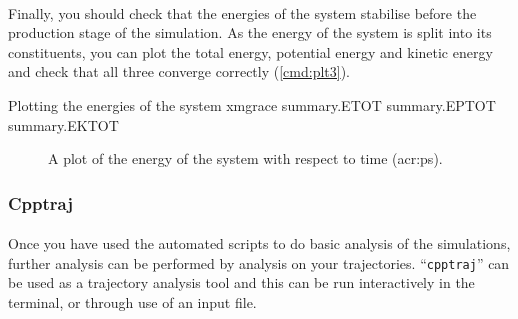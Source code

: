     \paragraph{}
        Finally, you should check that the energies of the system stabilise before the production stage of the simulation. As the energy of the system is split into its constituents, you can plot the total energy, potential energy and kinetic energy and check that all three converge correctly (\cref{cmd:plt3}).

    \begin{bashcmd}[label=cmd:plt3]{Plotting the energies of the system}
        xmgrace summary.ETOT summary.EPTOT summary.EKTOT
    \end{bashcmd}

    \begin{figure}[H]
        \centering
        \caption{A plot of the energy of the system with respect to time (\gls{acr:ps}).}
        \label{fig:En}
    \end{figure}

    \subsubsection{Cpptraj}
    \paragraph{}
        Once you have used the automated scripts to do basic analysis of the simulations, further analysis can be performed by analysis on your trajectories. \enquote{\texttt{cpptraj}} can be used as a trajectory analysis tool and this can be run interactively in the terminal, or through use of an input file. 

